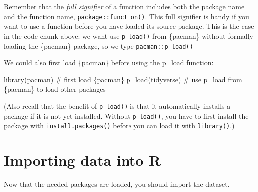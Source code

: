 \documentclass[
  letterpaper,
  DIV=11,
  numbers=noendperiod]{scrreprt}
\newenvironment{Shaded}{\begin{snugshade}}{\end{snugshade}}
\newcommand{\CommentTok}[1]{\textcolor[rgb]{0.37,0.37,0.37}{#1}}
\newcommand{\FunctionTok}[1]{\textcolor[rgb]{0.28,0.35,0.67}{#1}}
\newcommand{\NormalTok}[1]{\textcolor[rgb]{0.00,0.23,0.31}{#1}}
\begin{document}
\begin{tcolorbox}[enhanced jigsaw, titlerule=0mm, colback=white, left=2mm, breakable, opacitybacktitle=0.6, colbacktitle=quarto-callout-note-color!10!white, colframe=quarto-callout-note-color-frame, bottomtitle=1mm, opacityback=0, coltitle=black, arc=.35mm, toptitle=1mm, title=\textcolor{quarto-callout-note-color}{\faInfo}\hspace{0.5em}{Reminder}, leftrule=.75mm, toprule=.15mm, bottomrule=.15mm, rightrule=.15mm]

Remember that the \emph{full signifier} of a function includes both the
package name and the function name, \texttt{package::function()}. This
full signifier is handy if you want to use a function before you have
loaded its source package. This is the case in the code chunk above: we
want use \texttt{p\_load()} from \{pacman\} without formally loading the
\{pacman\} package, so we type \texttt{pacman::p\_load()}

We could also first load \{pacman\} before using the p\_load function:

\begin{Shaded}
\begin{Highlighting}[]
\FunctionTok{library}\NormalTok{(pacman) }\CommentTok{\# first load \{pacman\}}
\FunctionTok{p\_load}\NormalTok{(tidyverse) }\CommentTok{\# use \textasciigrave{}p\_load\textasciigrave{} from \{pacman\} to load other packages}
\end{Highlighting}
\end{Shaded}

(Also recall that the benefit of \texttt{p\_load()} is that it
automatically installs a package if it is not yet installed. Without
\texttt{p\_load()}, you have to first install the package with
\texttt{install.packages()} before you can load it with
\texttt{library()}.)

\end{tcolorbox}

\section{Importing data into R}\label{importing-data-into-r}

Now that the needed packages are loaded, you should import the dataset.
\end{document}
